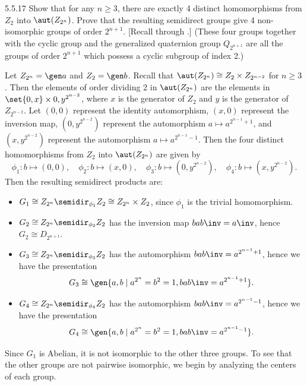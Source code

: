 \begin{exercise}{5.5.17}
    Show that for any $n \geq 3$, there are exactly 4 distinct homomorphisms from $Z_2$ into $\aut(Z_{2^n})$.
	Prove that the resulting semidirect groups give 4 non-isomorphic groups of order $2^{n + 1}$. [Recall  through .] (These four groups together with the cyclic group and the generalized quaternion group $Q_{2^{n + 1}}$ are all the groups of order $2^{n + 1}$ which possess a cyclic subgroup of index 2.)
\end{exercise}

\begin{sol}
    Let $Z_{2^n} = \gen a$ and $Z_2 = \gen b$.
	Recall that $\aut(Z_{2^n}) \cong Z_2 \times Z_{2^{n - 2}}$ for $n \geq 3$.
	Then the elements of order dividing 2 in $\aut(Z_{2^n})$ are the elements in $\set{0, x} \times {0, y^{2^{n - 2}}}$, where $x$ is the generator of $Z_2$ and $y$ is the generator of $Z_{2^{n - 2}}$.
	Let $(0, 0)$ represent the identity automorphism, $(x, 0)$ represent the inversion map, $(0, y^{2^{n - 2}})$ represent the automorphism $a \mapsto a^{2^{n - 1} + 1}$, and $(x, y^{2^{n - 2}})$ represent the automorphism $a \mapsto a^{2^{n - 1} - 1}$.
	Then the four distinct homomorphisms from $Z_2$ into $\aut(Z_{2^n})$ are given by
    \[
    	\phi_1 : b \mapsto (0, 0), \quad \phi_2 : b \mapsto (x, 0), \quad \phi_3 : b \mapsto (0, y^{2^{n - 2}}), \quad \phi_4 : b \mapsto (x, y^{2^{n - 2}}).
    \]
    Then the resulting semidirect products are:
    \begin{itemize}
        \item $G_1 \cong Z_{2^n} \semidir_{\phi_1} Z_2 \cong Z_{2^n} \times Z_2$, since $\phi_1$ is the trivial homomorphism.
        \item $G_2 \cong Z_{2^n} \semidir_{\phi_2} Z_2$ has the inversion map $bab\inv = a\inv$, hence $G_2 \cong D_{2^{n + 1}}$.
        \item $G_3 \cong Z_{2^n} \semidir_{\phi_3} Z_2$ has the automorphism $bab\inv = a^{2^{n - 1} + 1}$, hence we have the presentation
        \[
        	G_3 \cong \gen{a, b \mid a^{2^n} = b^2 = 1, bab\inv = a^{2^{n - 1} + 1}}.
        \]
        \item $G_4 \cong Z_{2^n} \semidir_{\phi_4} Z_2$ has the automorphism $bab\inv = a^{2^{n - 1} - 1}$, hence we have the presentation
        \[
        	G_4 \cong \gen{a, b \mid a^{2^n} = b^2 = 1, bab\inv = a^{2^{n - 1} - 1}}.
        \]
    \end{itemize}
    Since $G_1$ is Abelian, it is not isomorphic to the other three groups.
	To see that the other groups are not pairwise isomorphic, we begin by analyzing the centers of each group.


\end{sol}
